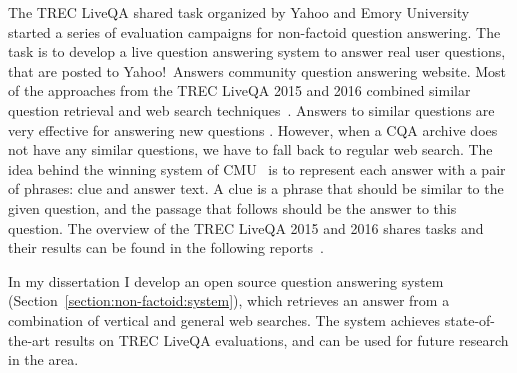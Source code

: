 The TREC LiveQA shared task organized by Yahoo and Emory University started a series of evaluation campaigns for non-factoid question answering.
The task is to develop a live question answering system to answer real user questions, that are posted to Yahoo!~Answers community question answering website.
Most of the approaches from the TREC LiveQA 2015 and 2016 combined similar question retrieval and web search techniques~\cite{savenkov_liveqa15,wang2015cmu,ecnucs_liveqa15}.
Answers to similar questions are very effective for answering new questions \cite{carmel2000eresponder,savenkov_liveqa15}.
However, when a CQA archive does not have any similar questions, we have to fall back to regular web search.
The idea behind the winning system of CMU~\cite{wang2015cmu} is to represent each answer with a pair of phrases: clue and answer text.
A clue is a phrase that should be similar to the given question, and the passage that follows should be the answer to this question.
The overview of the TREC LiveQA 2015 and 2016 shares tasks and their results can be found in the following reports~\cite{overviewliveqa15,overviewliveqa16}.

In my dissertation I develop an open source question answering system (Section~\ref{section:non-factoid:system}), which retrieves an answer from a combination of vertical and general web searches.
The system achieves state-of-the-art results on TREC LiveQA evaluations, and can be used for future research in the area.

